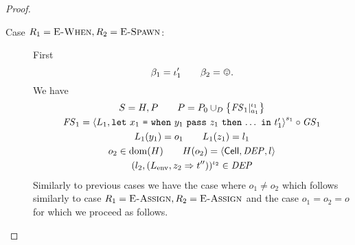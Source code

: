 \begin{proof}
\begin{description}
    \item[Case $R_1 = \mbox{{\sc E-When}}, R_2 = \mbox{\sc E-Spawn}$:] First 
      \begin{equation}
        \beta_1 = \iota'_1 \andalso \beta_2 = \smiley.
      \end{equation}
      We have
      \begin{equation}
        \begin{gathered}
          S = H, P \quad\quad P = P_0 \cup_D \left\{ \mathit{FS}_1|_{a_1}^{\iota_1}
          \right\} \\
          \mathit{FS}_1 = \mbox{$\langle L_1, \mbox{\mdseries\texttt{let}~$x_1$~\texttt{=}~$\mbox{\mdseries\texttt{when}~$y_1$~\texttt{pass}~$z_1$~\texttt{then}~$\dots$}$~\texttt{in}~$t'_1$} \rangle$}^{s_1} \circ \mathit{GS}_1
          \\ 
          L_1(y_1) = o_1 \quad\quad L_1(z_1) = l_1 \\
          o_2 \in \mbox{$\mathrm{dom}$}(H) \quad\quad H(o_2) = \mbox{$\langle \mbox{$\mathsf{Cell}$}{}, \mathit{DEP}, l \rangle$} \\
          (l_2, (L_{\text{env}}, z_2 \Rightarrow t''))^{\iota_2} \in \mathit{DEP}
        \end{gathered}
      \end{equation}
      Similarly to previous cases we have the case where $o_1 \neq o_2$ which
      follows similarly to case $R_1 = \mbox{{\sc E-Assign}}, R_2 = \mbox{{\sc E-Assign}}$ and the case
      $o_1 = o_2 = o$ for which we proceed as follows.


\end{description}
\end{proof}
